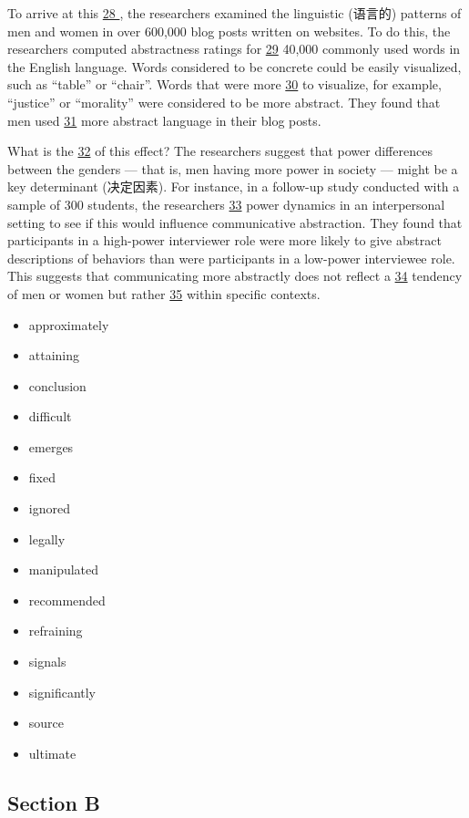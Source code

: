 \documentclass[UTF8,11pt]{ctexart}
\begin{document}
To arrive at this \uline{28 }, the researchers examined the linguistic (语言的) patterns of men and women in over 600,000 blog posts written on websites. To do this, the researchers computed abstractness ratings for \uline{29} 40,000 commonly used words in the English language. Words considered to be concrete could be easily visualized, such as “table” or “chair”. Words that were more \uline{30} to visualize, for example, “justice” or “morality” were considered to be more abstract. They found that men used \uline{31} more abstract language in their blog posts.


What is the \uline{32} of this effect? The researchers suggest that power differences between the genders — that is, men having more power in society — might be a key determinant (决定因素). For instance, in a follow-up study conducted with a sample of 300 students, the researchers \uline{33} power dynamics in an interpersonal setting to see if this would influence communicative abstraction. They found that participants in a high-power interviewer role were more likely to give abstract descriptions of behaviors than were participants in a low-power interviewee role. This suggests that communicating more abstractly does not reflect a \uline{34} tendency of men or women but rather \uline{35} within specific contexts.


\begin{itemize}[leftmargin=2em,itemsep=.2em,topsep=.4em]\item[A.] approximately
\item[B.] attaining
\item[C.] conclusion
\item[D.] difficult
\item[E.] emerges
\item[F.] fixed
\item[G.] ignored
\item[H.] legally
\item[I.] manipulated
\item[J.] recommended
\item[K.] refraining
\item[L.] signals
\item[M.] significantly
\item[N.] source
\item[O.] ultimate
\end{itemize}

\subsection*{\textbf{Section B}}
\end{document}
